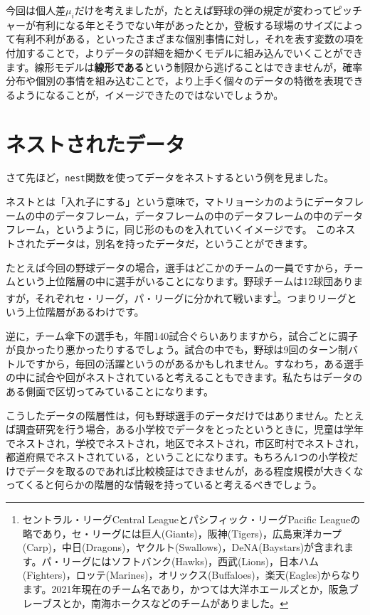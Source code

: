 \documentclass{ltjsbook}
\begin{document}
今回は個人差$\mu_i$だけを考えましたが，たとえば野球の弾の規定が変わってピッチャーが有利になる年とそうでない年があったとか，登板する球場のサイズによって有利不利がある，といったさまざまな個別事情に対し，それを表す変数の項を付加することで，よりデータの詳細を細かくモデルに組み込んでいくことができます。線形モデルは\textbf{線形である}という制限から逃げることはできませんが，確率分布や個別の事情を組み込むことで，より上手く個々のデータの特徴を表現できるようになることが，イメージできたのではないでしょうか。

\section{ネストされたデータ}
さて先ほど，\verb|nest|関数を使ってデータをネストするという例を見ました。

ネストとは「入れ子にする」という意味で，マトリョーシカのようにデータフレームの中のデータフレーム，データフレームの中のデータフレームの中のデータフレーム，というように，同じ形のものを入れていくイメージです。
このネストされたデータは，別名を持ったデータだ，ということができます。

たとえば今回の野球データの場合，選手はどこかのチームの一員ですから，チームという上位階層の中に選手がいることになります。野球チームは12球団ありますが，それぞれセ・リーグ，パ・リーグに分かれて戦います\footnote{セントラル・リーグCentral Leagueとパシフィック・リーグPacific Leagueの略であり，セ・リーグには巨人(Giants)，阪神(Tigers)，広島東洋カープ(Carp)，中日(Dragons)，ヤクルト(Swallows)，DeNA(Baystars)が含まれます。パ・リーグにはソフトバンク(Hawks)，西武(Lions)，日本ハム(Fighters)，ロッテ(Marines)，オリックス(Buffaloes)，楽天(Eagles)からなります。2021年現在のチーム名であり，かつては大洋ホエールズとか，阪急ブレーブスとか，南海ホークスなどのチームがありました。}。つまりリーグという上位階層があるわけです。

逆に，チーム傘下の選手も，年間140試合ぐらいありますから，試合ごとに調子が良かったり悪かったりするでしょう。試合の中でも，野球は9回のターン制バトルですから，毎回の活躍というのがあるかもしれません。すなわち，ある選手の中に試合や回がネストされていると考えることもできます。私たちはデータのある側面で区切ってみていることになります。

こうしたデータの階層性は，何も野球選手のデータだけではありません。たとえば調査研究を行う場合，ある小学校でデータをとったというときに，児童は学年でネストされ，学校でネストされ，地区でネストされ，市区町村でネストされ，都道府県でネストされている，ということになります。もちろん1つの小学校だけでデータを取るのであれば比較検証はできませんが，ある程度規模が大きくなってくると何らかの階層的な情報を持っていると考えるべきでしょう。
\end{document}
